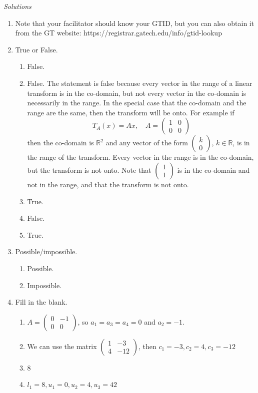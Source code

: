 \documentclass[12pt]{exam}
\begin{document}
\begin{questions}
\begin{parts}
    \end{parts}

\end{questions}

\newpage
{\color{DarkBlue} \textit{Solutions} 
\begin{enumerate}
    \item Note that your facilitator should know your GTID, but you can also obtain it from the GT website: https://registrar.gatech.edu/info/gtid-lookup
    \item True or False. 
    \begin{enumerate}
        \item False.
        \item False. The statement is false because every vector in the range of a linear transform is in the co-domain, but not every vector in the co-domain is necessarily in the range. In the special case that the co-domain and the range are the same, then the transform will be onto. For example if $$T_A(x) = Ax, \quad A = \begin{pmatrix} 1&0\\0&0 \end{pmatrix}$$ then the co-domain is $\mathbb R^2$ and any vector of the form $\begin{pmatrix} k\\0 \end{pmatrix}$, $k \in \mathbb R$, is in the range of the transform. Every vector in the range is in the co-domain, but the transform is not onto. Note that $\begin{pmatrix} 1\\1 \end{pmatrix}$ is in the co-domain and not in the range, and that the transform is not onto.
        \item True.
        \item False. 
        \item True.
    \end{enumerate}
    \item Possible/impossible. 
    \begin{enumerate}
        \item Possible. 
        \item Impossible.
    \end{enumerate}
    \item Fill in the blank. 
    \begin{enumerate}
        \item $A = \begin{pmatrix} 0&-1\\0&0 \end{pmatrix}$, so $a_1 = a_3 = a_4 = 0$ and $a_2 = -1$.
        \item We can use the matrix $\begin{pmatrix}1 & -3\\4&-12 \end{pmatrix}$, then $c_1 = -3, c_2 = 4, c_3 = -12$
        \item 8
        \item $l_1 = 8, u_1 = 0, u_2 = 4, u_3 = 42$
    \end{enumerate}
\end{enumerate}

} 
\end{document}
